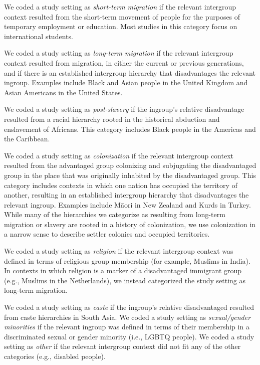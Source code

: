 \documentclass[12pt, letterpaper]{article}
\begin{document}
We coded a study setting as \emph{short-term migration} if the relevant
intergroup context resulted from the short-term movement of people for
the purposes of temporary employment or education. Most studies in this
category focus on international students.

We coded a study setting as \emph{long-term migration} if the relevant
intergroup context resulted from migration, in either the current or
previous generations, and if there is an established intergroup
hierarchy that disadvantages the relevant ingroup. Examples include
Black and Asian people in the United Kingdom and Asian Americans in the
United States.

We coded a study setting as \emph{post-slavery} if the ingroup's
relative disadvantage resulted from a racial hierarchy rooted in the
historical abduction and enslavement of Africans. This category includes
Black people in the Americas and the Caribbean.

We coded a study setting as \emph{colonization} if the relevant
intergroup context resulted from the advantaged group colonizing and
subjugating the disadvantaged group in the place that was originally
inhabited by the disadvantaged group. This category includes contexts in
which one nation has occupied the territory of another, resulting in an
established intergroup hierarchy that disadvantages the relevant
ingroup. Examples include Māori in New Zealand and Kurds in Turkey.
While many of the hierarchies we categorize as resulting from long-term
migration or slavery are rooted in a history of colonization, we use
colonization in a narrow sense to describe settler colonies and occupied
territories.

We coded a study setting as \emph{religion} if the relevant intergroup
context was defined in terms of religious group membership (for example,
Muslims in India). In contexts in which religion is a marker of a
disadvantaged immigrant group (e.g., Muslims in the Netherlands), we
instead categorized the study setting as long-term migration.

We coded a study setting as \emph{caste} if the ingroup's relative
disadvantaged resulted from caste hierarchies in South Asia. We coded a
study setting as \emph{sexual/gender minorities} if the relevant ingroup
was defined in terms of their membership in a discriminated sexual or
gender minority (i.e., LGBTQ people). We coded a study setting as
\emph{other} if the relevant intergroup context did not fit any of the
other categories (e.g., disabled people).
\end{document}
